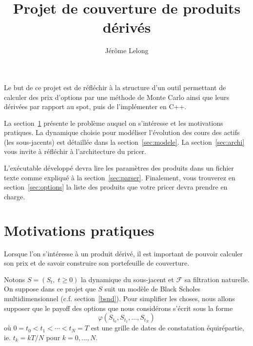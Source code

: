 \documentclass[a4paper,11pt]{article}
\title{Projet de couverture de produits dérivés}
\author{Jérôme Lelong}
\def\cf{{\mathcal F}}
\begin{document}
\maketitle

Le but de ce projet  est de réfléchir à la structure d'un outil permettant de calculer des prix d'options par une méthode de Monte Carlo ainsi que leurs dérivées par rapport au spot, puis de l'implémenter en C++.

La section~\ref{sec:motiv} présente le problème auquel on s'intéresse et les motivations pratiques. La dynamique choisie pour modéliser l'évolution des cours des actifs (les sous-jacents) est détaillée dans la section~\ref{sec:modele}.  La section~\ref{sec:archi} vous invite à réfléchir à l'architecture du pricer.

L'exécutable développé devra lire les paramètres des produits dans un fichier texte comme expliqué à la section~\ref{sec:parser}. Finalement, vous trouverez en section~\ref{sec:options} la liste des produits que votre pricer devra prendre en charge.

\section{Motivations pratiques}
\label{sec:motiv}

Lorsque l'on s'intéresse à un produit dérivé, il est important de pouvoir calculer son prix et de savoir construire son portefeuille de couverture.

Notons $S = (S_t, \; t \ge 0)$ la dynamique du sous-jacent et $\cf$ sa filtration naturelle. On suppose dans ce projet que $S$ suit un modèle de Black Scholes multidimensionnel (c.f.  section~\ref{bsnd}).  Pour simplifier les choses, nous allons supposer que le payoff des options que nous considérons s'écrit sous la forme
\begin{equation*}
 \varphi(S_{t_0}, S_{t_1}, \dots, S_{t_N})
\end{equation*}
où $0 = t_0 < t_1 < \cdots < t_N = T$ est une grille de dates de constatation équirépartie, ie. $t_k = kT / N$ pour $k=0,\dots, N$.
\end{document}
